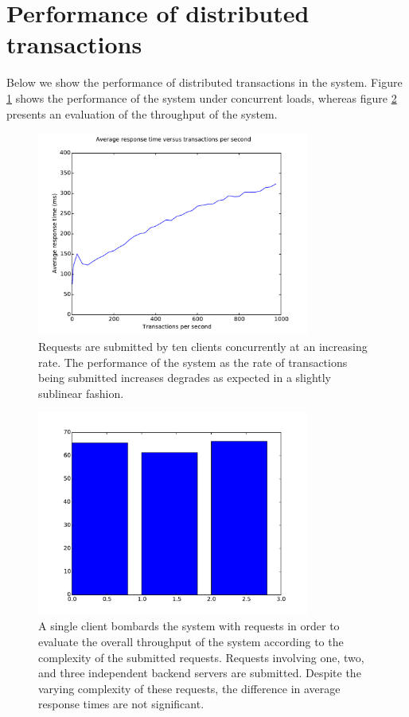 \documentclass[letterpaper,11pt]{article}
\begin{document}
\section{Performance of distributed transactions}

Below we show the performance of distributed transactions in the system.
Figure \ref{fig:performance-vs-tps} shows the performance of the system under
concurrent loads, whereas figure \ref{fig:throughput} presents an evaluation of
the throughput of the system.

\begin{figure}[ht]
    \centering
    \includegraphics[width=0.8\textwidth]{figure.pdf}
    \caption{
        Requests are submitted by ten clients concurrently at an
        increasing rate. The performance of the system as the rate of
        transactions being submitted increases degrades as expected in a
        slightly sublinear fashion.
    }
    \label{fig:performance-vs-tps}
\end{figure}

\begin{figure}[ht]
    \centering
    \includegraphics[width=0.8\textwidth]{bars.pdf}
    \caption{
        A single client bombards the system with requests in order to evaluate
        the overall throughput of the system according to the complexity of the
        submitted requests. Requests involving one, two, and three independent
        backend servers are submitted. Despite the varying complexity of these
        requests, the difference in average response times are not significant.
    }
    \label{fig:throughput}
\end{figure}
\end{document}
